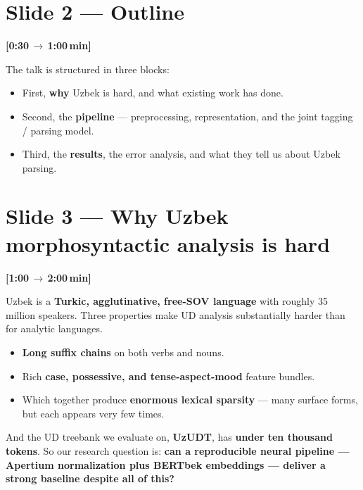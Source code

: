 \documentclass[12pt,a4paper]{article}
\newcommand{\timing}[2]{%
   \par\noindent\textbf{\small [#1\,$\to$\,#2\,min]}\par\vspace{0.2em}}
\newcommand{\say}[1]{\textbf{#1}}
\begin{document}
\section*{Slide 2 --- Outline}
\timing{0:30}{1:00}

The talk is structured in three blocks:

\begin{itemize}
   \item First, \textbf{why} Uzbek is hard, and what existing work has done.
   \item Second, the \textbf{pipeline} --- preprocessing, representation, and the joint tagging / parsing model.
   \item Third, the \textbf{results}, the error analysis, and what they tell us about Uzbek parsing.
\end{itemize}

\section*{Slide 3 --- Why Uzbek morphosyntactic analysis is hard}
\timing{1:00}{2:00}

Uzbek is a \say{Turkic, agglutinative, free-SOV language} with roughly
35 million speakers. Three properties make UD analysis substantially
harder than for analytic languages.

\begin{itemize}
   \item \textbf{Long suffix chains} on both verbs and nouns.
   \item Rich \textbf{case, possessive, and tense-aspect-mood} feature bundles.
   \item Which together produce \textbf{enormous lexical sparsity} --- many surface forms, but each appears very few times.
\end{itemize}

\noindent
And the UD treebank we evaluate on, \say{UzUDT}, has \textbf{under ten
thousand tokens}. So our research question is: \say{can a reproducible
neural pipeline --- Apertium normalization plus BERTbek embeddings ---
deliver a strong baseline despite all of this?}

\end{document}
